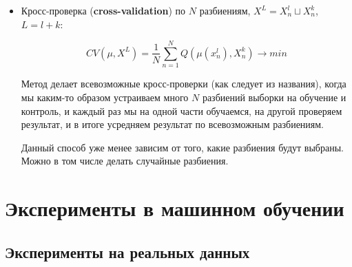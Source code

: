 \documentclass{article}
\begin{document}
\begin{itemize}
\item Кросс-проверка (\textbf{cross-validation}) по $N$ разбиениям,
$X^L = X_n^l \sqcup X_n^k$, $L = l + k$:

$$CV(\mu, X^L) = \frac{1}{N}\sum\limits_{n = 1}^N Q(\mu(x_n^l), X_n^k) \rightarrow min$$

Метод делает всевозможные кросс-проверки (как следует из названия), когда мы каким-то образом устраиваем много $N$ разбиений выборки на обучение и контроль, и каждый раз мы на одной части обучаемся, на другой проверяем результат, и в итоге усредняем результат по всевозможным разбиениям.

Данный способ уже менее зависим от того, какие разбиения будут выбраны. Можно в том числе делать случайные разбиения.
\end{itemize}

\section{Эксперименты в машинном обучении}

\subsection{Эксперименты на реальных данных}
\end{document}
